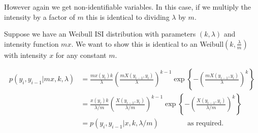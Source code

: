\documentclass[../main.tex]{subfiles}
\begin{document}
 However again we get non-identifiable variables. In this case, if we multiply the intensity by a factor of $m$ this is identical to dividing $\lambda$ by $m$. \\
  {\color{blue}
   Suppose we have an Weibull ISI distribution with parameters $(k,\lambda)$ and intensity function $m x$. We want to show this is identical to an Weibull$(k,\frac{\lambda}{m})$ with intensity $x$ for any constant $m$.
   
     \begin{align}
 p(y_i, y_{i-1}|mx, k, \lambda) &= \frac{mx(y_i)k}{\lambda} \left( \frac{mX(y_{i-1} , y_i )}{\lambda} \right)^{k-1} \exp \left\{ -\left( \frac{mX(y_{i-1} , y_i )}{\lambda} \right)^k \right\} \\
 &=\frac{x(y_i)k}{\lambda/m} \left( \frac{X(y_{i-1} , y_i )}{\lambda/m} \right)^{k-1} \exp \left\{ -\left( \frac{X(y_{i-1} , y_i )}{\lambda/m} \right)^k \right\} \\ 
 &= p(y_i, y_{i-1}|x,k, \lambda/m) \qquad \qquad \text{as required.}
 \end{align}
  }
 
\end{document}
